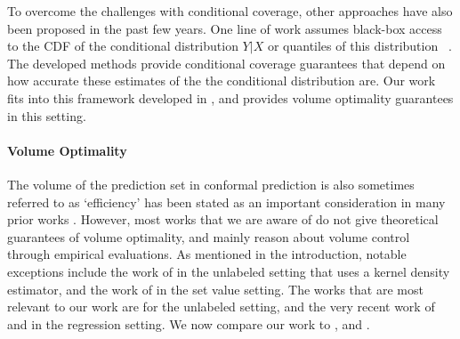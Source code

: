 To overcome the challenges with conditional coverage, other approaches have also been proposed in the past few years. One line of work assumes black-box access to the CDF of the conditional distribution $Y|X$ or quantiles of this distribution ~\citep{romano2019conformalized, chernozhukov2021distributional}. The developed methods provide conditional coverage guarantees that depend on how accurate these estimates of the the conditional distribution are. %
Our work fits into this framework developed in \citep{chernozhukov2021distributional}, and provides volume optimality guarantees in this setting.  





%


\paragraph{Volume Optimality} 
The volume of the prediction set in conformal prediction is also sometimes referred to as `efficiency' has been stated as an important consideration in many prior works \citep[see e.g.,][]{shafer2008tutorial, angelopoulos2023survey}. However, most works that we are aware of do not give theoretical guarantees of volume optimality, and mainly reason about volume control through empirical evaluations. As mentioned in the introduction, notable exceptions include the work of \citet{Lei2013DistributionFreePS} in the unlabeled setting that uses a kernel density estimator, and the work of \citet{Sadinle2016LeastAS} in the set value setting.  The works that are most relevant to our work are \citet{Lei2013DistributionFreePS} for the unlabeled setting, and the very recent work of \citet*{izbicki2020flexible,izbicki2022cd} and \citet{kiyani2024length} in the regression setting. We now compare our work to \cite{Lei2013DistributionFreePS}, \citet{izbicki2020flexible,izbicki2022cd} and \cite{kiyani2024length}.  

